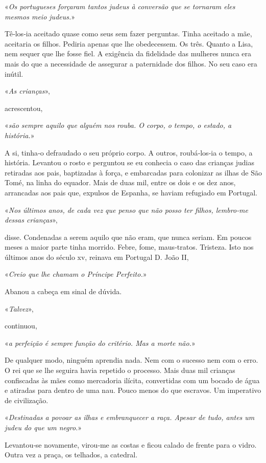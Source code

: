 «\emph{Os portugueses forçaram tantos judeus à conversão que se tornaram
eles mesmos meio judeus.}»

Tê­‑los­‑ia aceitado quase como seus sem fazer perguntas. Tinha aceitado
a mãe, aceitaria os filhos. Pediria apenas que lhe obedecessem. Os três.
Quanto a Lisa, nem sequer que lhe fosse fiel. A exigência da fidelidade
das mulheres nunca era mais do que a necessidade de assegurar a
paternidade dos filhos. No seu caso era inútil.

«\emph{As crianças}»,

acrescentou,

«\emph{são sempre aquilo que alguém nos rouba. O corpo, o tempo, o
estado, a história.}»

A si, tinha­‑o defraudado o seu próprio corpo. A outros, roubá­‑los­‑ia
o tempo, a história. Levantou o rosto e perguntou se eu conhecia o caso
das crianças judias retiradas aos pais, baptizadas à força, e embarcadas
para colonizar as ilhas de São Tomé, na linha do equador. Mais de duas
mil, entre os dois e os dez anos, arrancadas aos pais que, expulsos de
Espanha, se haviam refugiado em Portugal.

«\emph{Nos últimos anos, de cada vez que penso que não posso ter filhos,
lembro­‑me dessas crianças}»,

disse. Condenadas a serem aquilo que não eram, que nunca seriam. Em
poucos meses a maior parte tinha morrido. Febre, fome, maus­‑tratos.
Tristeza. Isto nos últimos anos do século xv, reinava em Portugal D.
João II,

«\emph{Creio que lhe chamam o Príncipe Perfeito.}»

Abanou a cabeça em sinal de dúvida.

«\emph{Talvez}»,

continuou,

«\emph{a perfeição é sempre função do critério. Mas a morte não.}»

De qualquer modo, ninguém aprendia nada. Nem com o sucesso nem com o
erro. O rei que se lhe seguira havia repetido o processo. Mais duas mil
crianças confiscadas às mães como mercadoria ilícita, convertidas com um
bocado de água e atiradas para dentro de uma nau. Pouco menos do que
escravos. Um imperativo de civilização.

«\emph{Destinadas a povoar as ilhas e embranquecer a raça. Apesar de
tudo, antes um judeu do que um negro.}»

Levantou­‑se novamente, virou­‑me as costas e ficou calado de frente
para o vidro. Outra vez a praça, os telhados, a catedral.

